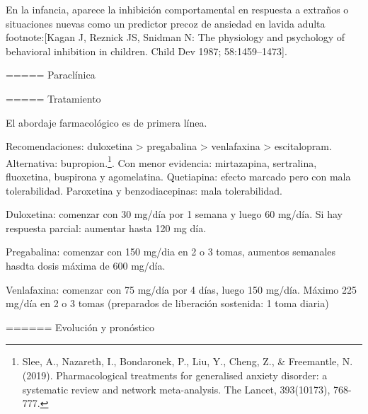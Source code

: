 En la infancia, aparece la inhibición comportamental en respuesta a extraños o situaciones nuevas como un predictor precoz de ansiedad en lavida adulta footnote:[Kagan J, Reznick JS, Snidman N: The physiology and psychology of behavioral inhibition in children. Child Dev 1987; 58:1459–1473].

===== Paraclínica

===== Tratamiento

El abordaje farmacológico es de primera línea.

Recomendaciones: duloxetina > pregabalina > venlafaxina > escitalopram. Alternativa: bupropion.\footnote{Slee, A., Nazareth, I., Bondaronek, P., Liu, Y., Cheng, Z., \& Freemantle, N. (2019). Pharmacological treatments for generalised anxiety disorder: a systematic review and network meta-analysis. The Lancet, 393(10173), 768-777.}. Con menor evidencia: mirtazapina, sertralina, fluoxetina, buspirona y agomelatina. Quetiapina: efecto marcado pero con mala tolerabilidad. Paroxetina y benzodiacepinas: mala tolerabilidad.

Duloxetina: comenzar con 30 mg/día por 1 semana y luego 60 mg/día. Si hay respuesta parcial: aumentar hasta 120 mg día.

Pregabalina: comenzar con 150 mg/dia en 2 o 3 tomas, aumentos semanales hasdta dosis máxima de 600 mg/día.

Venlafaxina: comenzar con 75 mg/día por 4 días, luego 150 mg/día. Máximo 225 mg/día en 2 o 3 tomas (preparados de liberación sostenida: 1 toma diaria)

====== Evolución y pronóstico
